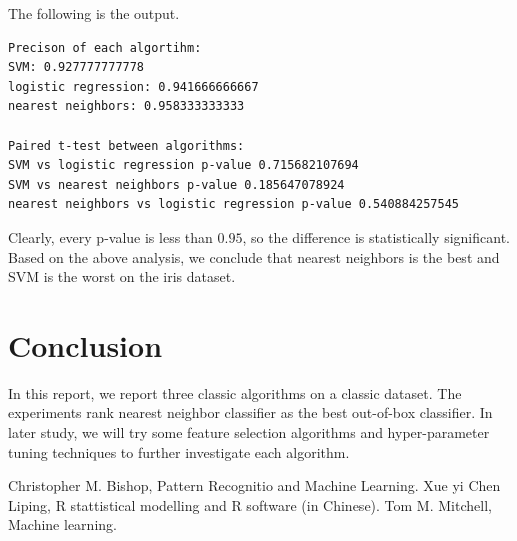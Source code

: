 \documentclass[a4paper, 11pt]{article}
\begin{document}
The following is the output.

\begin{verbatim}
Precison of each algortihm:
SVM: 0.927777777778
logistic regression: 0.941666666667
nearest neighbors: 0.958333333333

Paired t-test between algorithms:
SVM vs logistic regression p-value 0.715682107694
SVM vs nearest neighbors p-value 0.185647078924
nearest neighbors vs logistic regression p-value 0.540884257545
\end{verbatim}

Clearly, every p-value is less than $0.95$, so the 
difference is statistically significant.
Based on the above analysis, 
we conclude that nearest neighbors is the best and
SVM is the worst on the iris dataset.

\section{Conclusion}

In this report, we report three classic algorithms on a classic dataset.
The experiments rank nearest neighbor classifier as the best out-of-box 
classifier.
In later study, we will try some feature selection algorithms
and hyper-parameter tuning techniques to further investigate each algorithm.

\begin{thebibliography}{99}
   Christopher M. Bishop, Pattern Recognitio and Machine Learning.
   Xue yi Chen Liping, R stattistical modelling and R software (in Chinese).
   Tom M. Mitchell, Machine learning.
\end{thebibliography}
\end{document}

